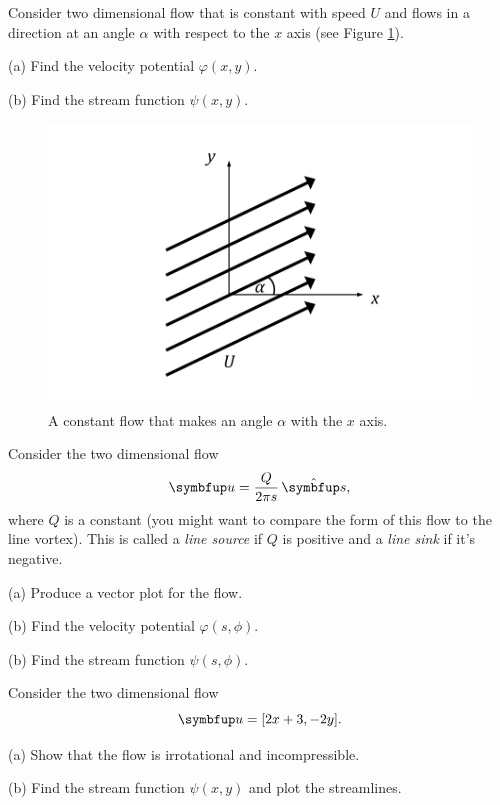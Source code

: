 \begin{problem}
\label{prob_uniform_pot}
Consider two dimensional flow that is constant with speed $U$ and flows in a direction at an angle $\alpha$ with respect to the $x$ axis (see Figure \ref{fig_uniform_flow_angle}).  

(a) Find the velocity potential $\varphi(x, y)$.

(b) Find the stream function $\psi(x, y)$.

\begin{figure}[t]
\centering\includegraphics[width=0.7\linewidth]{Figures/Chapter3/fig_uniform_flow_angle}
\caption{A constant flow that makes an angle $\alpha$ with the $x$ axis.}
\label{fig_uniform_flow_angle}
\end{figure}
\end{problem}

\begin{problem}
\label{prob_line_source}
Consider the two dimensional flow 
\begin{equation}
\uu = \frac{Q}{2\pi s} \, \unit{s},
\end{equation}
where $Q$ is a constant (you might want to compare the form of this flow to the line vortex).  This is called a \emph{line source} if $Q$ is positive and a \emph{line sink} if it's negative.

(a) Produce a vector plot for the flow.

(b) Find the  velocity potential $\varphi(s, \phi)$.

(b) Find the stream function $\psi(s, \phi)$.
\end{problem}

\begin{problem}
Consider the two dimensional flow
\[
\uu = [2x+3, -2y].
\]

(a) Show that the flow is irrotational and incompressible.

(b) Find the stream function $\psi(x, y)$ and plot the streamlines.
\end{problem}
